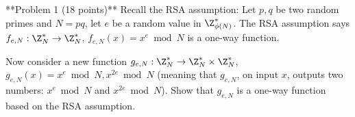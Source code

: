 **Problem 1 (18 points)** Recall the RSA assumption: Let $p,q$ be two random primes and $N=pq$, let $e$ be a random value in $\Z_{\phi(N)}^*$. The RSA assumption says $f_{e, N}: \Z_N^* \to \Z_N^*$, $f_{e, N}(x) = x^e\bmod N $ is a one-way function.

Now consider a new function $g_{e, N}: \Z_N^* \to \Z_N^* \times \Z_N^*$,  $g_{e, N}(x) = x^e\bmod N, x^{2e} \bmod N$ (meaning that $g_{e, N}$, on input $x$, outputs two numbers: $x^e\bmod N$ and $x^{2e} \bmod N$). Show that $g_{e, N}$ is a one-way function based on the RSA assumption. 
